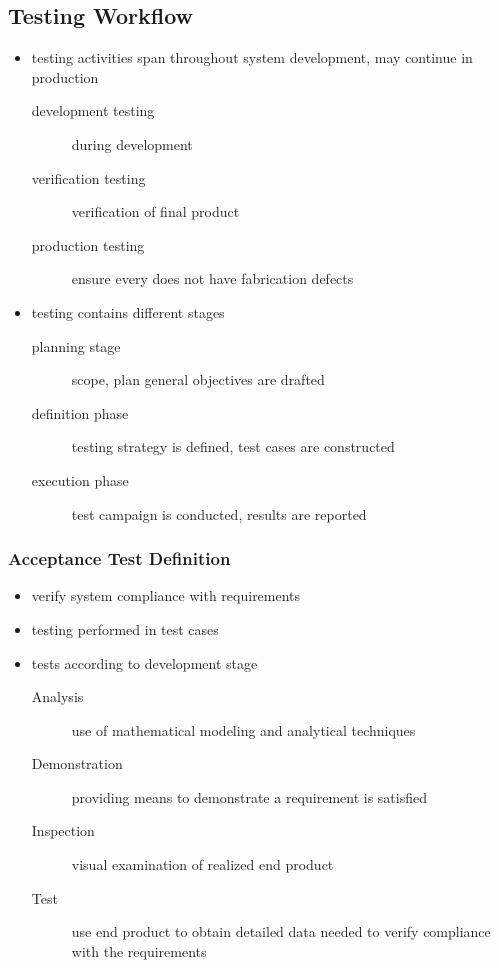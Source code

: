 \documentclass[a4paper, 10pt]{article}
\begin{document}
\subsection*{Testing Workflow}
\begin{itemize}
    \item testing activities span throughout system development, may continue in production
    \begin{description}
        \item[development testing] during development
        \item[verification testing] verification of final product
        \item[production testing] ensure every does not have fabrication defects
    \end{description}
    \item testing contains different stages
    \begin{description}
        \item[planning stage] scope, plan general objectives are drafted
        \item[definition phase] testing strategy is defined, test cases are constructed
        \item[execution phase] test campaign is conducted, results are reported
    \end{description}
\end{itemize}

\subsubsection*{Acceptance Test Definition}
\begin{itemize}
    \item verify system compliance with requirements
    \item testing performed in test cases
    \item tests according to development stage
    \begin{description}
        \item[Analysis] use of mathematical modeling and analytical techniques
        \item[Demonstration] providing means to demonstrate a requirement is satisfied
        \item[Inspection] visual examination of realized end product
        \item[Test] use end product to obtain detailed data needed to verify compliance with the requirements
    \end{description}
\end{itemize}
\end{document}
